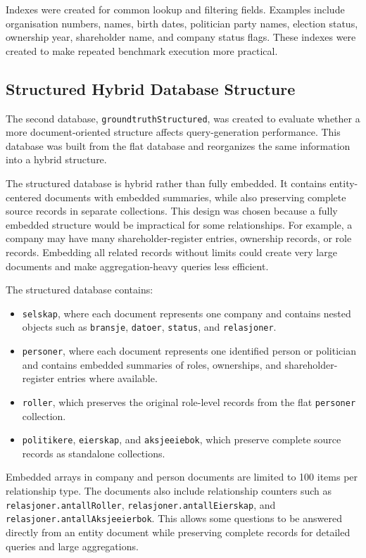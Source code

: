 Indexes were created for common lookup and filtering fields. Examples include organisation numbers, names, birth dates, politician party names, election status, ownership year, shareholder name, and company status flags. These indexes were created to make repeated benchmark execution more practical.

\subsection{Structured Hybrid Database Structure}

The second database, \texttt{groundtruthStructured}, was created to evaluate whether a more document-oriented structure affects query-generation performance. This database was built from the flat database and reorganizes the same information into a hybrid structure.

The structured database is hybrid rather than fully embedded. It contains entity-centered documents with embedded summaries, while also preserving complete source records in separate collections. This design was chosen because a fully embedded structure would be impractical for some relationships. For example, a company may have many shareholder-register entries, ownership records, or role records. Embedding all related records without limits could create very large documents and make aggregation-heavy queries less efficient.

The structured database contains:

\begin{itemize}
    \item \texttt{selskap}, where each document represents one company and contains nested objects such as \texttt{bransje}, \texttt{datoer}, \texttt{status}, and \texttt{relasjoner}.
    \item \texttt{personer}, where each document represents one identified person or politician and contains embedded summaries of roles, ownerships, and shareholder-register entries where available.
    \item \texttt{roller}, which preserves the original role-level records from the flat \texttt{personer} collection.
    \item \texttt{politikere}, \texttt{eierskap}, and \texttt{aksjeeiebok}, which preserve complete source records as standalone collections.
\end{itemize}

Embedded arrays in company and person documents are limited to 100 items per relationship type. The documents also include relationship counters such as \texttt{relasjoner.antallRoller}, \texttt{relasjoner.antallEierskap}, and \texttt{relasjoner.antallAksjeeierbok}. This allows some questions to be answered directly from an entity document while preserving complete records for detailed queries and large aggregations.

